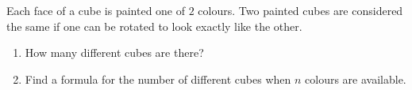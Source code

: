 Each face of a cube is painted one of $2$ colours. Two painted cubes are considered the same if one can be rotated to look exactly like the other.
\begin{enumerate}
\item[(a)] How many different cubes are there?
\item[(b)] Find a formula for the number of different cubes when $n$ colours are available.
\end{enumerate}
